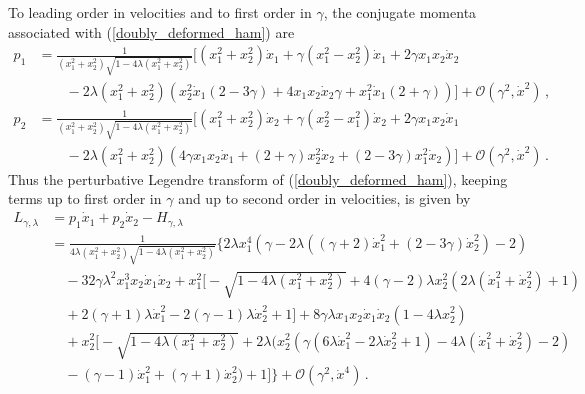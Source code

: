 \documentclass[12pt]{article}
\numberwithin{equation}{section}
\begin{document}
To leading order in velocities and to first order in $\gamma$, the conjugate momenta associated with (\ref{doubly_deformed_ham}) are
%
\begin{align}
    p_1 &= \frac{1}{{ \left( x_1^2 + x_2^2 \right) \sqrt{1 - 4 \lambda \left( x_1^2 + x_2^2 \right) }  }} \Bigg[ \left( x_1^2 + x_2^2 \right) \dot{x}_1 + \gamma \left( x_1^2 - x_2^2 \right) \dot{x}_1 + 2 \gamma x_1 x_2 \dot{x}_2  \nonumber \\
    &\qquad - 2 \lambda \left( x_1^2 + x_2^2 \right) \left( x_2^2 \dot{x}_1 ( 2 - 3 \gamma ) + 4 x_1 x_2 \dot{x}_2 \gamma + x_1^2 \dot{x}_1 ( 2 + \gamma ) \right) \Bigg] + \mathcal{O} \left( \gamma^2, \dot{x}^2 \right) \, , \nonumber \\
    p_2 &= \frac{1}{{ \left( x_1^2 + x_2^2 \right) \sqrt{1 - 4 \lambda \left( x_1^2 + x_2^2 \right) }  }} \Bigg[  \left( x_1^2 + x_2^2 \right) \dot{x}_2 + \gamma \left( x_2^2 - x_1^2 \right) \dot{x}_2  + 2 \gamma x_1 x_2 \dot{x}_1 \nonumber \\
    &\qquad - 2 \lambda \left( x_1^2 + x_2^2 \right) \left( 4 \gamma x_1 x_2 \dot{x}_1 + ( 2 + \gamma ) x_2^2 \dot{x}_2 + ( 2 - 3 \gamma ) x_1^2 \dot{x}_2 \right) \Bigg] + \mathcal{O} \left( \gamma^2, \dot{x}^2 \right) \, .
\end{align}
%
Thus the perturbative Legendre transform of (\ref{doubly_deformed_ham}), keeping terms up to first order in $\gamma$ and up to second order in velocities, is given by
%
\begin{align}\label{L_gamma_lambda_answer}
    L_{\gamma, \lambda} &= p_1 \dot{x}_1 + p_2 \dot{x}_2 - H_{\gamma, \lambda} \nonumber \\
    &= \frac{1}{4 \lambda \left( x_1^2 + x_2^2 \right) \sqrt{ 1 - 4 \lambda ( x_1^2 + x_2^2 ) } } \Bigg\{  2 \lambda   x_1^4 \left(\gamma -2 \lambda  \left((\gamma +2)  \dot{x}_1^2+(2-3 \gamma )  \dot{x}_2^2\right)-2\right) \nonumber \\
    &\quad -32 \gamma  \lambda ^2  x_1^3  x_2  \dot{x}_1  \dot{x}_2+ x_1^2 \Big[ -\sqrt{1-4 \lambda  \left( x_1^2+ x_2^2\right)}+4 (\gamma -2) \lambda   x_2^2 \left(2 \lambda  \left( \dot{x}_1^2+ \dot{x}_2^2\right)+1\right) \nonumber \\
    &\quad +2 (\gamma +1) \lambda   \dot{x}_1^2-2 (\gamma -1) \lambda   \dot{x}_2^2+1 \Big] +8 \gamma  \lambda   x_1  x_2  \dot{x}_1  \dot{x}_2 \left(1-4 \lambda   x_2^2\right)  \nonumber \\
    &\quad + x_2^2 \Big[ -\sqrt{1-4 \lambda  \left( x_1^2+ x_2^2\right)}  + 2 \lambda  \Big( x_2^2 \left(\gamma  \left(6 \lambda   \dot{x}_1^2-2 \lambda   \dot{x}_2^2+1\right)-4 \lambda  \left( \dot{x}_1^2+ \dot{x}_2^2\right)-2\right)  \nonumber \\
    &\quad -(\gamma -1)  \dot{x}_1^2+(\gamma +1)  \dot{x}_2^2 \Big)+1 \Big] \Bigg\} + \mathcal{O} \left( \gamma^2, \dot{x}^4 \right) \, .
\end{align}
\end{document}
